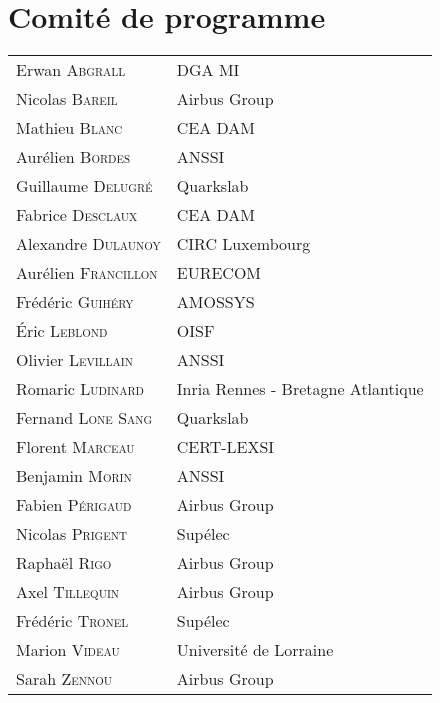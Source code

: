 \section*{Comité de programme}
\begin{tabular}{@{}p{5cm}@{}p{6.5cm}@{}}
  Erwan \textsc{Abgrall}          & DGA MI                                       \\
  Nicolas \textsc{Bareil}         & Airbus Group                                 \\
  Mathieu \textsc{Blanc}          & CEA DAM                                      \\
  Aurélien \textsc{Bordes}        & ANSSI                                        \\
  Guillaume \textsc{Delugré}      & Quarkslab                                    \\
  Fabrice \textsc{Desclaux}       & CEA DAM                                      \\
  Alexandre \textsc{Dulaunoy}     & CIRC Luxembourg                              \\
  Aurélien \textsc{Francillon}    & EURECOM                                      \\
  Frédéric \textsc{Guihéry}       & AMOSSYS                                      \\
  Éric \textsc{Leblond}           & OISF                                         \\
  Olivier \textsc{Levillain}      & ANSSI                                        \\
  Romaric \textsc{Ludinard}       & Inria Rennes - Bretagne Atlantique           \\
  Fernand \textsc{Lone Sang}      & Quarkslab                                    \\
  Florent \textsc{Marceau}        & CERT-LEXSI                                   \\
  Benjamin \textsc{Morin}         & ANSSI                                        \\
  Fabien \textsc{Périgaud}        & Airbus Group                                 \\
  Nicolas \textsc{Prigent}        & Sup\'elec                                    \\
  Raphaël \textsc{Rigo}           & Airbus Group                                 \\
  Axel \textsc{Tillequin}         & Airbus Group                                 \\
  Fr\'ed\'eric \textsc{Tronel}    & Sup\'elec                                    \\
  Marion \textsc{Videau}          & Université de Lorraine                       \\
  Sarah \textsc{Zennou}           & Airbus Group                                 \\
\end{tabular}

